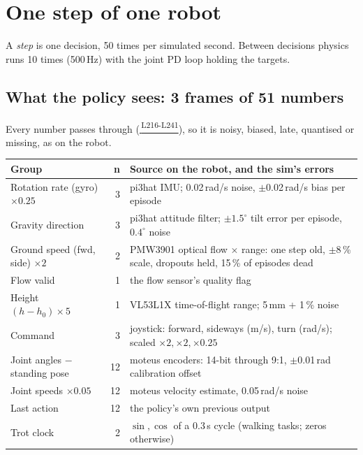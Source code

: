 \documentclass[10pt,letterpaper]{article}
\newcommand{\repo}{https://github.com/soujanya957/capstan-drive-leg/blob/231ca53/CapstanPedal/fullbuild_v4}
\newcommand{\gh}[2]{\href{\repo/#1\##2}{\texttt{\detokenize{#1}}\,\textsuperscript{\tiny #2}}}
\newcommand{\cc}[1]{\texttt{\detokenize{#1}}}
\begin{document}
\section{One step of one robot}

A \emph{step} is one decision, 50 times per simulated second. Between decisions physics runs 10 times (500\,Hz) with the joint
PD loop holding the targets.

\subsection{What the policy sees: 3 frames of 51 numbers}
Every number passes through \cc{sense()} (\gh{rl2/core.py}{L216-L241}), so it is noisy, biased, late, quantised or missing, as on the robot.

\begin{small}
\begin{tabularx}{\linewidth}{@{}lrX@{}}
\toprule
\textbf{Group} & \textbf{n} & \textbf{Source on the robot, and the sim's errors} \\ \midrule
Rotation rate (gyro) $\times0.25$ & 3 & pi3hat IMU; 0.02\,rad/s noise, $\pm$0.02\,rad/s bias per episode \\
Gravity direction & 3 & pi3hat attitude filter; $\pm1.5^\circ$ tilt error per episode, $0.4^\circ$ noise \\
Ground speed (fwd, side) $\times2$ & 2 & PMW3901 optical flow $\times$ range: one step old, $\pm$8\,\% scale, dropouts held, 15\,\% of episodes dead \\
Flow valid & 1 & the flow sensor's quality flag \\
Height $(h-h_0)\times5$ & 1 & VL53L1X time-of-flight range; 5\,mm + 1\,\% noise \\
Command & 3 & joystick: forward, sideways (m/s), turn (rad/s); scaled $\times2, \times2, \times0.25$ \\
Joint angles $-$ standing pose & 12 & moteus encoders: 14-bit through 9:1, $\pm$0.01\,rad calibration offset \\
Joint speeds $\times0.05$ & 12 & moteus velocity estimate, 0.05\,rad/s noise \\
Last action & 12 & the policy's own previous output \\
Trot clock & 2 & $\sin, \cos$ of a 0.3\,s cycle (walking tasks; zeros otherwise) \\ \bottomrule
\end{tabularx}
\end{small}
\end{document}
